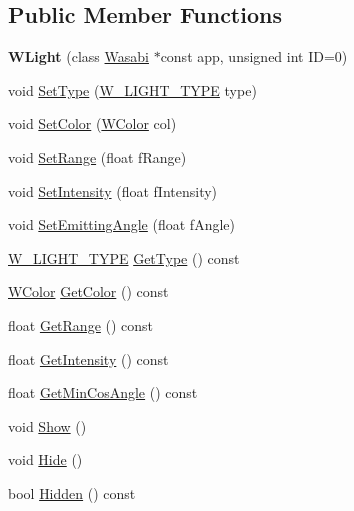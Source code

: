 \subsection*{Public Member Functions}
\begin{DoxyCompactItemize}
\item 
{\bfseries W\+Light} (class \hyperlink{class_wasabi}{Wasabi} $\ast$const app, unsigned int ID=0)\hypertarget{class_w_light_a55fe57fb4a47a2239793822fa9ca332a}{}\label{class_w_light_a55fe57fb4a47a2239793822fa9ca332a}

\item 
void \hyperlink{class_w_light_a29168dfad9cc155b862d61bbf1c23ca2}{Set\+Type} (\hyperlink{_w_light_8h_a3a77efe290145c3198d50f1ef128d917}{W\+\_\+\+L\+I\+G\+H\+T\+\_\+\+T\+Y\+PE} type)
\item 
void \hyperlink{class_w_light_ad8a618d7625dc87753599efb6be3371e}{Set\+Color} (\hyperlink{class_w_color}{W\+Color} col)
\item 
void \hyperlink{class_w_light_a24ad8bb394f9acecd76e9c92483fa793}{Set\+Range} (float f\+Range)
\item 
void \hyperlink{class_w_light_a5e58c76c1b18476a8b23d91949ccd0e0}{Set\+Intensity} (float f\+Intensity)
\item 
void \hyperlink{class_w_light_a801d2cecfd84eedc40cff675d8ac3b33}{Set\+Emitting\+Angle} (float f\+Angle)
\item 
\hyperlink{_w_light_8h_a3a77efe290145c3198d50f1ef128d917}{W\+\_\+\+L\+I\+G\+H\+T\+\_\+\+T\+Y\+PE} \hyperlink{class_w_light_a133c7d538abd4ed044f0f51c0d414b69}{Get\+Type} () const 
\item 
\hyperlink{class_w_color}{W\+Color} \hyperlink{class_w_light_a234e023a370ed2a36e465ed6c424bee6}{Get\+Color} () const 
\item 
float \hyperlink{class_w_light_aa204273d11379321a1f04f09d46b82ca}{Get\+Range} () const 
\item 
float \hyperlink{class_w_light_a9e48f7c039a0bb028cba0dfb1ff99e15}{Get\+Intensity} () const 
\item 
float \hyperlink{class_w_light_a77bb86e98b0ecfcb71db2bf3cb81246f}{Get\+Min\+Cos\+Angle} () const 
\item 
void \hyperlink{class_w_light_a65761ae21487736be514539ef21e2250}{Show} ()
\item 
void \hyperlink{class_w_light_a1e3c4835c28d4030e70fac984ea0345a}{Hide} ()
\item 
bool \hyperlink{class_w_light_aadea2d522da34fdecdd2aa9ea91ba931}{Hidden} () const 
\item 

\end{DoxyCompactItemize}
